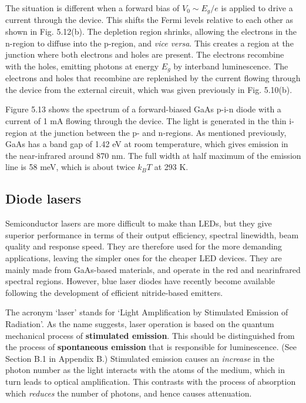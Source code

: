 \documentclass[12pt]{book}
\begin{document}
The situation is different when a forward bias of $V_0\sim E_g/e$ is applied to drive a current through the device. This shifts the Fermi levels relative to each other as shown in Fig. 5.12(b). The depletion region shrinks, allowing the electrons in the n-region to diffuse into the p-region, and \textit{vice versa}. This creates a region at the junction where both electrons and holes are present. The electrons recombine with the holes, emitting photons at energy $E_g$ by interband luminescence. The electrons and holes that recombine are replenished by the current flowing through the device from the external circuit, which was given previously in Fig. 5.10(b).

Figure 5.13 shows the spectrum of a forward-biased GaAs p-i-n diode with a current of 1 mA flowing through the device. The light is generated in the thin i-region at the junction between the p- and n-regions. As mentioned previously, GaAs has a band gap of 1.42 eV at room temperature, which gives emission in the near-infrared around 870 nm. The full width at half maximum of the emission line is 58 meV, which is about twice $k_BT$ at 293 K.

\subsection{Diode lasers}
Semiconductor lasers are more difficult to make than LEDs, but they give superior performance in terms of their output efficiency, spectral linewidth, beam quality and response speed. They are therefore used for the more demanding applications, leaving the simpler ones for the cheaper LED devices. They are mainly made from GaAs-based materials, and operate in the red and nearinfrared spectral regions. However, blue laser diodes have recently become available following the development of efficient nitride-based emitters.

The acronym `laser' stands for `Light Amplification by Stimulated Emission of Radiation'. As the name suggests, laser operation is based on the quantum mechanical process of \textbf{stimulated emission}. This should be distinguished from the process of \textbf{spontaneous emission} that is responsible for luminescence. (See Section B.1 in Appendix B.) Stimulated emission causes an \textit{increase} in the photon number as the light interacts with the atoms of the medium, which in turn leads to optical amplification. This contrasts with the process of absorption which \textit{reduces} the number of photons, and hence causes attenuation.
\end{document}
